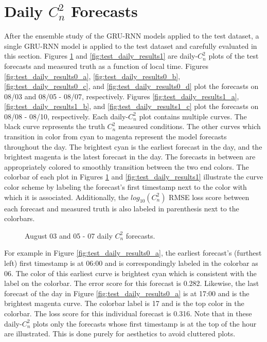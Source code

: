 \section{Daily $C_{n}^{2}$ Forecasts}
\label{sec:daily_cn2_forecasts}
After the ensemble study of the \ac{GRU-RNN} models applied to the test dataset, a single \ac{GRU-RNN} model is applied to the test dataset and carefully evaluated in this section. Figures \ref{fig:test_daily_results0} and \ref{fig:test_daily_results1} are daily-$C_{n}^{2}$ plots of the test forecasts and measured truth as a function of local time. Figures \ref{fig:test_daily_results0_a}, \ref{fig:test_daily_results0_b}, \ref{fig:test_daily_results0_c}, and \ref{fig:test_daily_results0_d} plot the forecasts on 08/03 and 08/05 - 08/07, respectively.  Figures \ref{fig:test_daily_results1_a}, \ref{fig:test_daily_results1_b}, and \ref{fig:test_daily_results1_c} plot the forecasts on 08/08 - 08/10, respectively. Each daily-$C_{n}^{2}$ plot contains multiple curves. The black curve represents the truth $C_{n}^{2}$ measured conditions. The other curves which transition in color from cyan to magenta represent the model forecasts throughout the day. The brightest cyan is the earliest forecast in the day, and the brightest magenta is the latest forecast in the day. The forecasts in between are appropriately colored to smoothly transition between the two end colors. The colorbar of each plot in Figures \ref{fig:test_daily_results0} and \ref{fig:test_daily_results1} illustrate the curve color scheme by labeling the forecast's first timestamp next to the color with which it is associated. Additionally, the $log_{10}(C_{n}^{2})$ RMSE loss score between each forecast and measured truth is also labeled in parenthesis next to the colorbars.
\begin{figure}[h!]
	\centering
	\hfill
	\hfill
	\caption{August 03 and 05 - 07 daily $C_{n}^{2}$ forecasts.}
	\label{fig:test_daily_results0}
\end{figure}
For example in Figure \ref{fig:test_daily_results0_a}, the earliest forecast's (furthest left) first timestamp is at 06:00 and is correspondingly labeled in the colorbar as 06. The color of this earliest curve is brightest cyan which is consistent with the label on the colorbar. The error score for this forecast is 0.282. Likewise, the last forecast of the day in Figure \ref{fig:test_daily_results0_a} is at 17:00 and is the brightest magenta curve. The colorbar label is 17 and is the top color in the colorbar. The loss score for this individual forecast is 0.316. Note that in these daily-$C_{n}^{2}$ plots only the forecasts whose first timestamp is at the top of the hour are illustrated. This is done purely for aesthetics to avoid cluttered plots.

